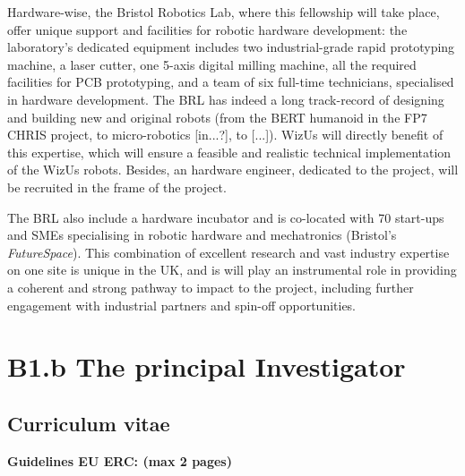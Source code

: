 \documentclass[]{article}
\newcommand{\project}{WizUs\xspace}
\newcommand{\eu}[1]{{\color{teal}\textbf{Guidelines EU ERC: #1}}}
\begin{document}
Hardware-wise, the Bristol Robotics Lab, where this fellowship will take place,
offer unique support and facilities for robotic hardware development: the
laboratory's dedicated equipment includes two industrial-grade rapid prototyping
machine, a laser cutter, one 5-axis digital milling machine, all the required
facilities for PCB prototyping, and a team of six full-time technicians,
specialised in hardware development. The BRL has indeed a long track-record of
designing and building new and original robots (from the BERT humanoid in the
FP7 CHRIS project, to micro-robotics [in...?], to [...]). \project will directly
benefit of this expertise, which will ensure a feasible and realistic technical
implementation of the \project robots. Besides, an hardware engineer, dedicated
to the project, will be recruited in the frame of the project.

The BRL also include a hardware incubator and is co-located with 70 start-ups
and SMEs specialising in robotic hardware and mechatronics (Bristol's
\emph{FutureSpace}). This combination of excellent research and vast industry
expertise on one site is unique in the UK, and is will play an instrumental role
in providing a coherent and strong pathway to impact to the project, including
further engagement with industrial partners and spin-off opportunities.









\newpage

\section{B1.b The principal Investigator}\label{the-principal-investigator}

\hypertarget{curriculum-vitae}{%
\subsection{Curriculum vitae}\label{curriculum-vitae}}

\eu{(max 2 pages)}

\newpage
\end{document}
